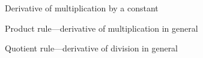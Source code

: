 
\begin{FormulaBox}{Derivative of multiplication by a constant}
 \Formula{\D{\K \cdot \Y}}{\K \cdot \D{\Y}}
\end{FormulaBox}

\begin{FormulaBox}{Product rule---derivative of multiplication in general}
 \Formula{\D{\U \cdot \V}}{\D{\U} \cdot \V + \U \cdot \D{\V}}
\end{FormulaBox}

\begin{FormulaBox}{Quotient rule---derivative of division in general}
 \Formula{\D{\frac{\Hi}{\Lo}}}%
 {}
\end{FormulaBox}

